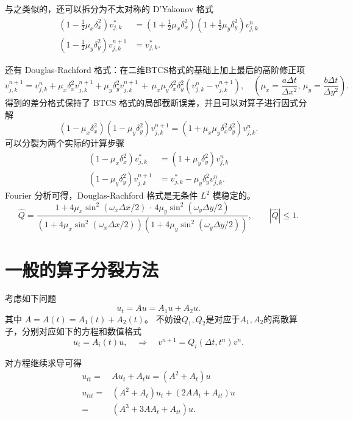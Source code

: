 \begin{remark}
    与之类似的，还可以拆分为不太对称的 D'Yakonov 格式
    \begin{align*}
        \left(1-\frac12 \mu_x \delta_x^2 \right) v_{j,k}^{*}   & =\left(1+\frac12 \mu_x \delta_x^2\right) \left(1+\frac12  \mu_y \delta_y^2\right)v_{j,k}^{n} \\
        \left(1-\frac12 \mu_y \delta_y^2 \right) v_{j,k}^{n+1} & = v_{j,k}^{*}.
    \end{align*}
\end{remark}


还有 Douglas-Rachford 格式：在二维BTCS格式的基础上加上最后的高阶修正项
\[
    v_{j,k}^{n+1} = v_{j,k}^n
    + \mu_x \delta_x^2 v_{j,k}^{n+1}
    + \mu_y \delta_y^2 v_{j,k}^{n+1}
    \,+\, \mu_x \mu_y \delta_x^2 \delta_y^2(v_{j,k}^{n} - v_{j,k}^{n+1}),\quad (\mu_x = \frac{a \Delta t}{\Delta x^2},\,\mu_y = \frac{b \Delta t}{\Delta y^2}).
\]
得到的差分格式保持了 BTCS 格式的局部截断误差，并且可以对算子进行因式分解
\[
    \left(1- \mu_x \delta_x^2 \right)\left(1- \mu_y \delta_y^2 \right) v_{j,k}^{n+1}=
    \left(1+ \mu_x \mu_y \delta_x^2 \delta_y^2\right) v_{j,k}^n.
\]
可以分裂为两个实际的计算步骤
\begin{align*}
    \left(1- \mu_x \delta_x^2 \right) v_{j,k}^{*}   & =\left(1+ \mu_y \delta_y^2\right) v_{j,k}^{n} \\
    \left(1- \mu_y \delta_y^2 \right) v_{j,k}^{n+1} & = v_{j,k}^{*} - \mu_y \delta_y^2 v_{j,k}^n.
\end{align*}
Fourier 分析可得，Douglas-Rachford 格式是无条件 $L^2$ 模稳定的。
\[
    \widehat{Q} =
    \frac{1 + 4 \mu_x \sin^2(\omega_x \Delta x/2)\,\cdot\,4 \mu_y \sin^2(\omega_y \Delta y/2)}{(1 + 4 \mu_x \sin^2(\omega_x \Delta x/2))(1 + 4 \mu_y \sin^2(\omega_y \Delta y/2))},\qquad
    |\widehat{Q}| \le 1.
\]


\section{一般的算子分裂方法}

考虑如下问题
\[
    u_t = A u = A_1 u + A_2 u.
\]
其中 $A = A(t) = A_1(t) + A_2(t)$。
不妨设$Q_1,Q_2$是对应于$A_1,A_2$的离散算子，分别对应如下的方程和数值格式
\[
    u_t = A_i(t) u ,\quad \Rightarrow\quad v^{n+1} = Q_i(\Delta t,t^n) v^n.
\]

对方程继续求导可得
\begin{align*}
    u_{tt} ={}  & A u_t + A_{t} u = (A^2 + A_{t}) u       \\
    u_{ttt} ={} & (A^2 + A_{t}) u_t + (2A A_t + A_{tt}) u \\
    ={}         & (A^3 + 3A A_t + A_{tt}) u.
\end{align*}

